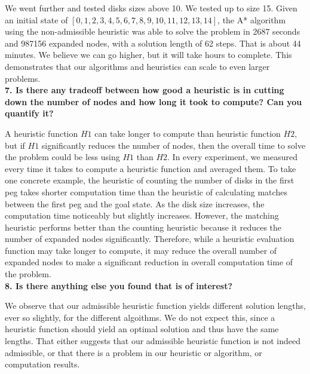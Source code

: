 We went further and tested disks sizes above 10. We tested up to size 15. Given an initial state of $[0,1,2,3,4,5,6,7,8,9,10,11,12,13,14]$, the A* algorithm using the non-admissible heuristic was able to solve the problem in 2687 seconds and 987156 expanded nodes, with a solution length of 62 steps. That is about 44 minutes. We believe we can go higher, but it will take hours to complete. This demonstrates that our algorithms and heuristics can scale to even larger problems.\\

\textbf{7. Is there any tradeoff between how good a heuristic is in cutting down the number of nodes and how long it took to compute? Can you quantify it?}

A heuristic function $H1$ can take longer to compute than heuristic function $H2$, but if $H1$ significantly reduces the number of nodes, then the overall time to solve the problem could be less using $H1$ than $H2$. In every experiment, we measured every time it takes to compute a heuristic function and averaged them. To take one concrete example, the heuristic of counting the number of disks in the first peg takes shorter computation time than the heuristic of calculating matches between the first peg and the goal state. As the disk size increases, the computation time noticeably but slightly increases. However, the matching heuristic performs better than the counting heuristic because it reduces the number of expanded nodes significantly. Therefore, while a heuristic evaluation function may take longer to compute, it may reduce the overall number of expanded nodes to make a significant reduction in overall computation time of the problem.\\

\textbf{8. Is there anything else you found that is of interest?}

We observe that our admissible heuristic function yields different solution lengths, ever so slightly, for the different algoithms. We do not expect this, since a heuristic function should yield an optimal solution and thus have the same lengths. That either suggests that our admissible heuristic function is not indeed admissible, or that there is a problem in our heuristic or algorithm, or computation results.
